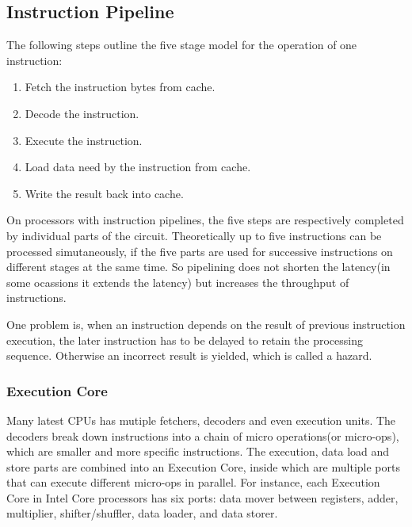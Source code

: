 \documentclass[a4paper]{report}
\begin{document}
\subsection{Instruction Pipeline} \indent

	The following steps outline the five stage model for the operation of one instruction:
	
	\begin{enumerate}
		\item Fetch the instruction bytes from cache.
		\item Decode the instruction.
		\item Execute the instruction.
		\item Load data need by the instruction from cache.
		\item Write the result back into cache.
	\end{enumerate}

	On processors with instruction pipelines, the five steps are respectively completed by individual parts of the circuit. Theoretically up to five instructions can be processed simutaneously, if the five parts are used for successive instructions on different stages at the same time. So pipelining does not shorten the latency(in some ocassions it extends the latency) but increases the throughput of instructions.


	One problem is, when an instruction depends on the result of previous instruction execution, the later instruction has to be delayed to retain the processing sequence. Otherwise an incorrect result is yielded, which is called a hazard.

\subsubsection{Execution Core} \indent

	Many latest CPUs has mutiple fetchers, decoders and even execution units. The decoders break down instructions into a chain of micro operations(or micro-ops), which are smaller and more specific instructions. The execution, data load and store parts are combined into an Execution Core, inside which are multiple ports that can execute different micro-ops in parallel. For instance, each Execution Core in Intel Core processors has six ports: data mover between registers, adder, multiplier, shifter/shuffler, data loader, and data storer. \cite{intelopt} %
\end{document}
